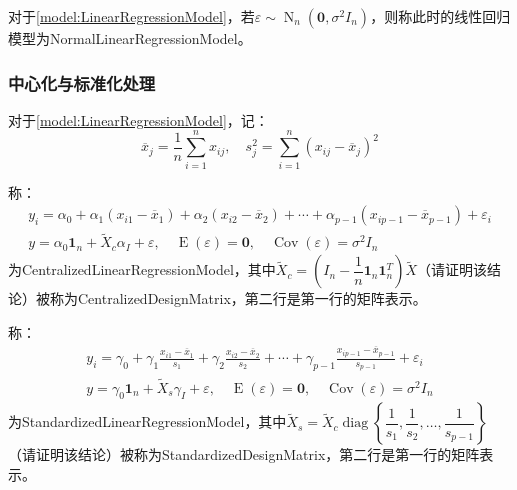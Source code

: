 \begin{definition}\label{model:NormalLinearRegressionModel}
	对于\cref{model:LinearRegressionModel}，若$\varepsilon\sim\operatorname{N}_n(\mathbf{0},\sigma^2I_n)$，则称此时的线性回归模型为\gls{NormalLinearRegressionModel}。
\end{definition}
\subsubsection{中心化与标准化处理}
\begin{definition}\label{model:CentralizedStandardizedLinearModel}
	对于\cref{model:LinearRegressionModel}，记：
	\begin{equation*}
		\overline{x}_j=\frac{1}{n}\sum_{i=1}^{n}x_{ij},\quad s_j^2=\sum_{i=1}^{n}(x_{ij}-\overline{x}_j)^2
	\end{equation*}\par
	称：
	\begin{gather*}
		y_i=\alpha_0+\alpha_1(x_{i1}-\overline{x}_1)+\alpha_2(x_{i2}-\overline{x}_2)+\cdots+\alpha_{p-1}(x_{ip-1}-\overline{x}_{p-1})+\varepsilon_i \\
		y=\alpha_0\mathbf{1}_n+\tilde{X}_c\alpha_I+\varepsilon,\quad\operatorname{E}(\varepsilon)=\mathbf{0},\quad\operatorname{Cov}(\varepsilon)=\sigma^2I_n
	\end{gather*}
	为\gls{CentralizedLinearRegressionModel}，其中$\tilde{X}_c=\left(I_n-\dfrac{1}{n}\mathbf{1}_n\mathbf{1}_n^T\right)\tilde{X}$（请证明该结论）被称为\gls{CentralizedDesignMatrix}，第二行是第一行的矩阵表示。\par
	称：
	\begin{gather*}
		y_i=\gamma_0+\gamma_1\frac{x_{i1}-\overline{x}_1}{s_1}+\gamma_2\frac{x_{i2}-\overline{x}_2}{s_2}+\cdots+\gamma_{p-1}\frac{x_{ip-1}-\overline{x}_{p-1}}{s_{p-1}}+\varepsilon_i \\
		y=\gamma_0\mathbf{1}_n+\tilde{X}_s\gamma_I+\varepsilon,\quad\operatorname{E}(\varepsilon)=\mathbf{0},\quad\operatorname{Cov}(\varepsilon)=\sigma^2I_n
	\end{gather*}
	为\gls{StandardizedLinearRegressionModel}，其中$\tilde{X}_s=\tilde{X}_c\operatorname{diag}\left\{\dfrac{1}{s_1},\dfrac{1}{s_2},\dots,\dfrac{1}{s_{p-1}}\right\}$（请证明该结论）被称为\gls{StandardizedDesignMatrix}，第二行是第一行的矩阵表示。
\end{definition}
